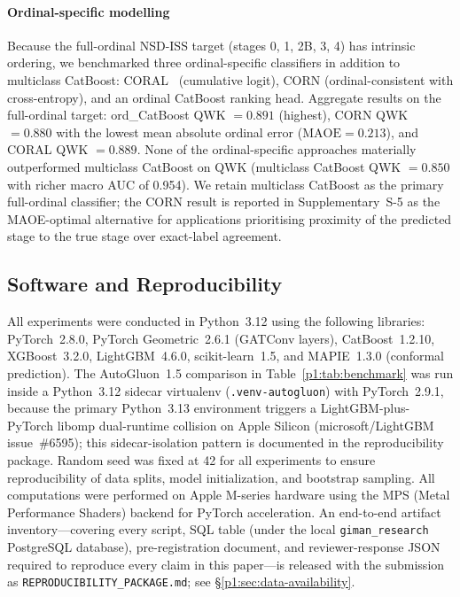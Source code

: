 \paragraph*{Ordinal-specific modelling} Because the full-ordinal NSD-ISS target (stages 0, 1, 2B, 3, 4) has intrinsic ordering, we benchmarked three ordinal-specific classifiers in addition to multiclass CatBoost: CORAL~\cite{bonnier2022ordinal} (cumulative logit), CORN (ordinal-consistent with cross-entropy), and an ordinal CatBoost ranking head. Aggregate results on the full-ordinal target: ord\_CatBoost QWK $=0.891$ (highest), CORN QWK $=0.880$ with the lowest mean absolute ordinal error ($\mathrm{MAOE} = 0.213$), and CORAL QWK $=0.889$. None of the ordinal-specific approaches materially outperformed multiclass CatBoost on QWK (multiclass CatBoost QWK $=0.850$ with richer macro AUC of 0.954). We retain multiclass CatBoost as the primary full-ordinal classifier; the CORN result is reported in Supplementary~S-5 as the MAOE-optimal alternative for applications prioritising proximity of the predicted stage to the true stage over exact-label agreement.

\subsection{Software and Reproducibility}
\label{p1:sec:methods:reproducibility}
All experiments were conducted in Python~3.12 using the following libraries: PyTorch~2.8.0, PyTorch Geometric~2.6.1 (GATConv layers), CatBoost~1.2.10, XGBoost~3.2.0, LightGBM~4.6.0, scikit-learn~1.5, and MAPIE~1.3.0 (conformal prediction). The AutoGluon~1.5 comparison in Table~\ref{p1:tab:benchmark} was run inside a Python~3.12 sidecar virtualenv (\texttt{.venv-autogluon}) with PyTorch~2.9.1, because the primary Python~3.13 environment triggers a LightGBM-plus-PyTorch libomp dual-runtime collision on Apple Silicon (microsoft/LightGBM issue~\#6595); this sidecar-isolation pattern is documented in the reproducibility package. Random seed was fixed at 42 for all experiments to ensure reproducibility of data splits, model initialization, and bootstrap sampling. All computations were performed on Apple M-series hardware using the MPS (Metal Performance Shaders) backend for PyTorch acceleration. An end-to-end artifact inventory---covering every script, SQL table (under the local \texttt{giman\_research} PostgreSQL database), pre-registration document, and reviewer-response JSON required to reproduce every claim in this paper---is released with the submission as \texttt{REPRODUCIBILITY\_PACKAGE.md}; see \S\ref{p1:sec:data-availability}.

